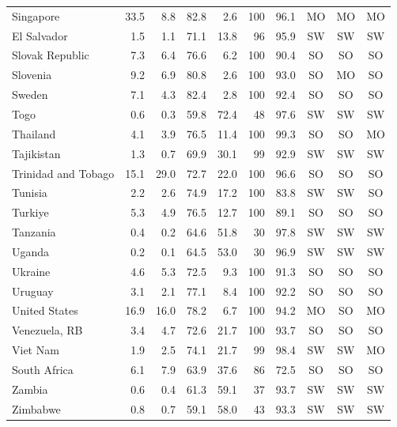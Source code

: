 \begin{longtable}{@{}lrrrrrrccc@{}}
Singapore & 33.5 & 8.8 & 82.8 & 2.6 & 100 & 96.1 & MO & MO & MO \\
El Salvador & 1.5 & 1.1 & 71.1 & 13.8 & 96 & 95.9 & SW & SW & SW \\
Slovak Republic & 7.3 & 6.4 & 76.6 & 6.2 & 100 & 90.4 & SO & SO & SO \\
Slovenia & 9.2 & 6.9 & 80.8 & 2.6 & 100 & 93.0 & SO & MO & SO \\
Sweden & 7.1 & 4.3 & 82.4 & 2.8 & 100 & 92.4 & SO & SO & SO \\
Togo & 0.6 & 0.3 & 59.8 & 72.4 & 48 & 97.6 & SW & SW & SW \\
Thailand & 4.1 & 3.9 & 76.5 & 11.4 & 100 & 99.3 & SO & SO & MO \\
Tajikistan & 1.3 & 0.7 & 69.9 & 30.1 & 99 & 92.9 & SW & SW & SW \\
Trinidad and Tobago & 15.1 & 29.0 & 72.7 & 22.0 & 100 & 96.6 & SO & SO & SO \\
Tunisia & 2.2 & 2.6 & 74.9 & 17.2 & 100 & 83.8 & SW & SW & SO \\
Turkiye & 5.3 & 4.9 & 76.5 & 12.7 & 100 & 89.1 & SO & SO & SO \\
Tanzania & 0.4 & 0.2 & 64.6 & 51.8 & 30 & 97.8 & SW & SW & SW \\
Uganda & 0.2 & 0.1 & 64.5 & 53.0 & 30 & 96.9 & SW & SW & SW \\
Ukraine & 4.6 & 5.3 & 72.5 & 9.3 & 100 & 91.3 & SO & SO & SO \\
Uruguay & 3.1 & 2.1 & 77.1 & 8.4 & 100 & 92.2 & SO & SO & SO \\
United States & 16.9 & 16.0 & 78.2 & 6.7 & 100 & 94.2 & MO & SO & MO \\
Venezuela, RB & 3.4 & 4.7 & 72.6 & 21.7 & 100 & 93.7 & SO & SO & SO \\
Viet Nam & 1.9 & 2.5 & 74.1 & 21.7 & 99 & 98.4 & SW & SW & MO \\
South Africa & 6.1 & 7.9 & 63.9 & 37.6 & 86 & 72.5 & SO & SO & SO \\
Zambia & 0.6 & 0.4 & 61.3 & 59.1 & 37 & 93.7 & SW & SW & SW \\
Zimbabwe & 0.8 & 0.7 & 59.1 & 58.0 & 43 & 93.3 & SW & SW & SW \\
\end{longtable}
\vspace{-6pt}
\endgroup
